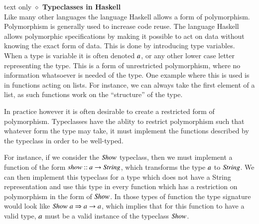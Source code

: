 \begin{changemargin}{1cm}{0cm}
\begin{expansionno}{text only}%
\noindent \textbf{$\diamond$ Typeclasses in Haskell} \\
Like many other languages the language Haskell allows a form of polymorphism.
Polymorphism is generally used to increase code reuse.
The language Haskell allows polymorphic specifications by making it possible to act on data without knowing the exact form of data.
This is done by introducing type variables.
When a type is variable it is often denoted \ensuremath{\Varid{a}}, or any other lower case letter representing the type.
This is a form of unrestricted polymorphism, where no information whatsoever is needed of the type.
One example where this is used is in functions acting on lists.
For instance, we can always take the first element of a list, as such functions work on the ``structure'' of the type.

In practice however it is often desirable to create a restricted form of polymorphism.
Typeclasses have the ablity to restrict polymorphism such that whatever form the type may take, it must implement the functions described by the typeclass in order to be well-typed.
 
For instance, if we consider the \ensuremath{\Conid{Show}} typeclass, then we must implement a function of the form \ensuremath{\Varid{show}\mathbin{::}\Varid{a}\to \Conid{String}}, which transforms the type \ensuremath{\Varid{a}} to \ensuremath{\Conid{String}}. 
We can then implement this typeclass for a type which does not have a String representation and use this type in every function which has a restriction on polymorphism in the form of \ensuremath{\Conid{Show}}. 
In those types of function the type signature would look like \ensuremath{\Conid{Show}\;\Varid{a}\Rightarrow \Varid{a}\to \Varid{a}}, which implies that for this function to have a valid type, \ensuremath{\Varid{a}} must be a valid instance of the typeclass \ensuremath{\Conid{Show}}.
\end{expansionno}
\end{changemargin}

